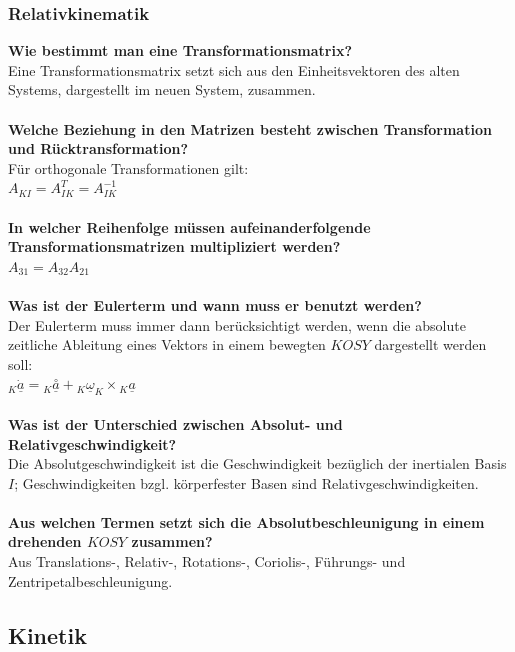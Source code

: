 \documentclass[a4paper,twocolumn,10pt]{article}
\begin{document}
\subsubsection{Relativkinematik}
\textbf{Wie bestimmt man eine Transformationsmatrix?}\\
Eine Transformationsmatrix setzt sich aus den Einheitsvektoren des alten Systems, dargestellt im neuen System, zusammen.\\\\
\textbf{Welche Beziehung in den Matrizen besteht zwischen Transformation und Rücktransformation?}\\
Für orthogonale Transformationen gilt:\\
$A_{KI}=A_{IK}^T=A_{IK}^{-1}$\\\\
\textbf{In welcher Reihenfolge müssen aufeinanderfolgende Transformationsmatrizen multipliziert werden?}\\
$A_{31}=A_{32}A_{21}$\\\\
\textbf{Was ist der Eulerterm und wann muss er benutzt werden?}\\
Der Eulerterm muss immer dann berücksichtigt werden, wenn die absolute zeitliche Ableitung eines Vektors in einem bewegten $KOSY$ dargestellt werden soll:\\
${}_K\underline{\dot{a}}={}_K\underline{\overset{\circ}{a}}+{}_K\underline{\omega}_K\times {}_K\underline{a}$\\\\
\textbf{Was ist der Unterschied zwischen Absolut- und Relativgeschwindigkeit?}\\
Die Absolutgeschwindigkeit ist die Geschwindigkeit bezüglich der inertialen Basis $I$; Geschwindigkeiten bzgl. körperfester Basen sind Relativgeschwindigkeiten.\\\\
\textbf{Aus welchen Termen setzt sich die Absolutbeschleunigung in einem drehenden $KOSY$ zusammen?}\\
Aus Translations-, Relativ-, Rotations-, Coriolis-, Führungs- und Zentripetalbeschleunigung.

\subsection{Kinetik}
\end{document}
